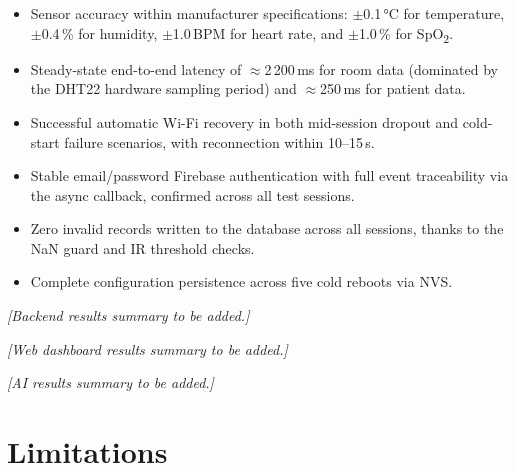\begin{itemize}
	\item Sensor accuracy within manufacturer specifications: $\pm$0.1\,°C for
	      temperature, $\pm$0.4\,\% for humidity, $\pm$1.0\,BPM for heart rate, and
	      $\pm$1.0\,\% for SpO\textsubscript{2}.
	\item Steady-state end-to-end latency of $\approx$2\,200\,ms for room data
	      (dominated by the DHT22 hardware sampling period) and $\approx$250\,ms for
	      patient data.
	\item Successful automatic Wi-Fi recovery in both mid-session dropout and
	      cold-start failure scenarios, with reconnection within 10--15\,s.
	\item Stable email/password Firebase authentication with full event traceability
	      via the async callback, confirmed across all test sessions.
	\item Zero invalid records written to the database across all sessions, thanks
	      to the NaN guard and IR threshold checks.
	\item Complete configuration persistence across five cold reboots via NVS.
\end{itemize}

\begin{center}
	\textit{[Backend results summary to be added.]}
\end{center}

\begin{center}
	\textit{[Web dashboard results summary to be added.]}
\end{center}

\begin{center}
	\textit{[AI results summary to be added.]}
\end{center}

\section{Limitations}

